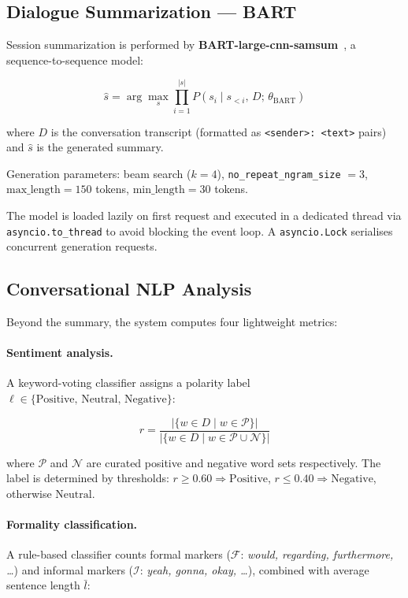 \documentclass[12pt,a4paper]{report}
\begin{document}
\subsection{Dialogue Summarization — BART}

Session summarization is performed by
\textbf{BART-large-cnn-samsum}~\cite{lewis2019bart}, a
sequence-to-sequence model:

\begin{equation}
  \hat{s} = \arg\max_{s} \prod_{i=1}^{|s|} P(s_i \mid s_{<i},\, D;\, \theta_\mathrm{BART})
\end{equation}

where $D$ is the conversation transcript (formatted as
\texttt{<sender>: <text>} pairs) and $\hat{s}$ is the generated
summary.

Generation parameters: beam search ($k=4$), \texttt{no\_repeat\_ngram\_size}
$= 3$, $\text{max\_length} = 150$ tokens, $\text{min\_length} = 30$
tokens.

The model is loaded lazily on first request and executed in a dedicated
thread via \texttt{asyncio.to\_thread} to avoid blocking the event loop.
A \texttt{asyncio.Lock} serialises concurrent generation requests.

\subsection{Conversational NLP Analysis}

Beyond the summary, the system computes four lightweight metrics:

\paragraph{Sentiment analysis.}
A keyword-voting classifier assigns a polarity label
$\ell \in \{\text{Positive},\, \text{Neutral},\, \text{Negative}\}$:

\begin{equation}
  r = \frac{|\{w \in D \mid w \in \mathcal{P}\}|}
           {|\{w \in D \mid w \in \mathcal{P} \cup \mathcal{N}\}|}
\end{equation}

where $\mathcal{P}$ and $\mathcal{N}$ are curated positive and negative
word sets respectively. The label is determined by thresholds:
$r \ge 0.60 \Rightarrow \text{Positive}$,
$r \le 0.40 \Rightarrow \text{Negative}$, otherwise $\text{Neutral}$.

\paragraph{Formality classification.}
A rule-based classifier counts formal markers
($\mathcal{F}$: \emph{would, regarding, furthermore, \ldots}) and
informal markers ($\mathcal{I}$: \emph{yeah, gonna, okay, \ldots}),
combined with average sentence length $\bar{l}$:
\end{document}
